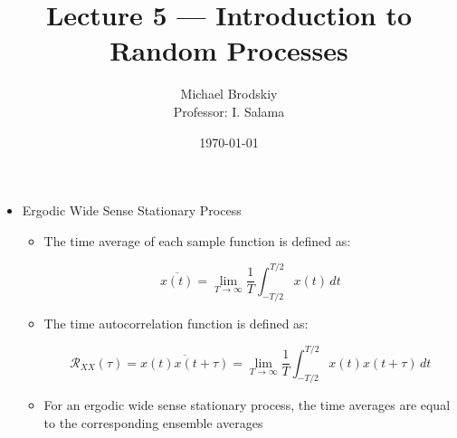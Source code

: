 


\title{Lecture 5 — Introduction to Random Processes}
\date{\today}
\author{Michael Brodskiy\\ \small Professor: I. Salama}



\maketitle

\begin{itemize}

  \item Ergodic Wide Sense Stationary Process

    \begin{itemize}

      \item The time average of each sample function is defined as:

        $$\overline{x(t)}=\lim_{T\to\infty}\frac{1}{T}\int_{-T/2}^{T/2}x(t)\,dt$$

      \item The time autocorrelation function is defined as:

        $$\mathcal{R}_{XX}(\tau)=\overline{x(t)x(t+\tau)}=\lim_{T\to\infty}\frac{1}{T}\int_{-T/2}^{T/2}x(t)x(t+\tau)\,dt$$

      \item For an ergodic wide sense stationary process, the time averages are equal to the corresponding ensemble averages

    \end{itemize}

\end{itemize}



